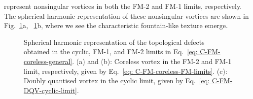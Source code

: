 represent nonsingular vortices in both the FM-2 and FM-1 limits, respectively.
The spherical harmonic representation of these nonsingular vortices are shown
in Fig.~\ref{fig: C-FM-coreless-initial-states}a,
~\ref{fig: C-FM-coreless-initial-states}b, where we see the characteristic
fountain-like texture emerge.
\begin{figure}
    \centering
    \caption[Spherical harmonic representation of a nonsingular vortex connection
        across a cyclic to ferromagnetic interface]
    {\label{fig: C-FM-coreless-initial-states}Spherical harmonic
        representation of the topological defects obtained in the cyclic, FM-1,
        and FM-2 limits in Eq.~\eqref{eq: C-FM-coreless-general}.
        (a) and (b): Coreless vortex in the FM-2 and FM-1 limit, respectively,
        given by Eq.~\eqref{eq: C-FM-coreless-FM-limits}.
        (c): Doubly quantised vortex in the cyclic limit, given by
        Eq.~\eqref{eq: C-FM-DQV-cyclic-limit}.}
\end{figure}

